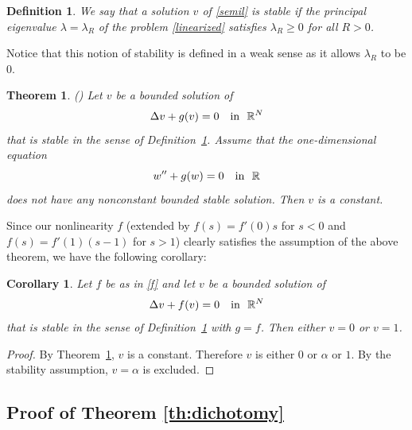 \documentclass[a4paper,12pt,fullpage]{article}
\numberwithin{equation}{section}
\newtheorem{Cor}[Lemma]{Corollary}
\newtheorem{Th}[Lemma]{Theorem}
\newtheorem{Def}[Lemma]{Definition}
\def\R{{\mathbb R}}
\begin{document}
\begin{Def}\label{def:stability}
We say that a solution $v$ of \eqref{semil} is stable if the principal eigenvalue $\lambda= \lambda_{R}$ of the problem \eqref{linearized} satisfies $\lambda_{R} \geq 0$ for all $R>0$.
\end{Def}

Notice that this notion of stability is defined in a weak sense as it allows $\lambda_R$ to be $0$.  

\begin{Th}\label{th:Liouville}{\rm{(\cite[Theorem 1.4]{LWWW})}}
Let $v$ be a bounded solution of 
\[
\Delta v + g(v)=0 \ \ \ \hbox{in} \ \ \R^N
\]
that is stable in the sense of Definition~\ref{def:stability}. Assume that the one-dimensional equation
\[
w''+g(w)=0 \quad\hbox{in}\ \ \R
\]
does not have any nonconstant bounded stable solution. Then $v$ is a constant.
\end{Th}

Since our nonlinearity $f$ (extended by $f(s)=f'(0)s$ for $s<0$ and $f(s)=f'(1)(s-1)$ for $s>1$) clearly satisfies the assumption of the above theorem, we have the following corollary:

\begin{Cor}\label{cor:Liouville}
Let $f$ be as in \eqref{f} and let $v$ be a bounded solution of 
\begin{equation}\label{E-RN}
\Delta v+f(v)=0\quad \hbox{in}\ \ \R^N
\end{equation}
that is stable in the sense of Definition~\ref{def:stability} with $g=f$. Then either $v=0$ or $v=1$.
\end{Cor}

\begin{proof}
By Theorem~\ref{th:Liouville}, $v$ is a constant. Therefore $v$ is either $0$ or $\alpha$ or $1$. By the stability assumption, $v=\alpha$ is excluded.
\end{proof}


\subsection{Proof of Theorem \ref{th:dichotomy}}\label{ss:proof-dichotomy}
\end{document}
